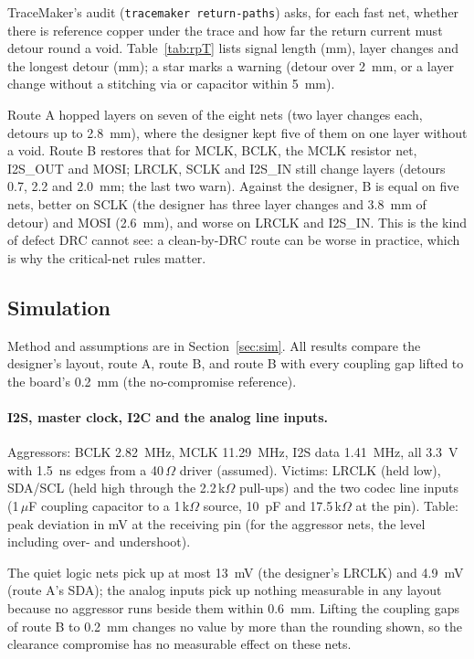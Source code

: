 \documentclass[10pt,a4paper]{article}
\begin{document}
TraceMaker's audit (\texttt{tracemaker return-paths}) asks, for each fast net, whether there is reference copper under the trace and how far the return current must detour round a void. Table~\ref{tab:rpT} lists
signal length (mm), layer changes and the longest detour (mm); a star marks a warning (detour over 2~mm, or a layer change without a stitching via or capacitor within 5~mm).
\begin{table}[H]\centering\small\caption{Return-path audit of the fast nets: signal mm / layer changes / detour mm.}\label{tab:rpT}\end{table}
Route A hopped layers on seven of the eight nets (two layer changes each, detours up to 2.8~mm), where the designer kept five of them on one layer without a void. Route B restores that for MCLK, BCLK, the MCLK resistor net, I2S\_OUT and MOSI;
LRCLK, SCLK and I2S\_IN still change layers (detours 0.7, 2.2 and 2.0~mm; the last two warn). Against the designer, B is equal on five nets, better on SCLK (the designer has three layer changes and 3.8~mm of detour) and MOSI (2.6~mm), and worse on LRCLK and I2S\_IN.
This is the kind of defect DRC cannot see: a clean-by-DRC route can be worse in practice, which is why the critical-net rules matter.

\subsection{Simulation}\label{sec:simT}

Method and assumptions are in Section~\ref{sec:sim}. All results compare the designer's layout, route A, route B, and route B with every coupling gap lifted to the board's 0.2~mm (the no-compromise reference).

\paragraph{I2S, master clock, I2C and the analog line inputs.} Aggressors: BCLK 2.82~MHz, MCLK 11.29~MHz, I2S data 1.41~MHz, all 3.3~V with 1.5~ns edges from a 40\,$\Omega$ driver (assumed). Victims: LRCLK (held low), SDA/SCL (held high through the 2.2\,k$\Omega$ pull-ups) and the two codec line inputs
(1\,$\mu$F coupling capacitor to a 1\,k$\Omega$ source, 10~pF and 17.5\,k$\Omega$ at the pin). Table: peak deviation in mV at the receiving pin (for the aggressor nets, the level including over- and undershoot).
\begin{table}[H]\centering\small\caption{I2S case: peak deviation (mV) at the codec pin. 2 $\mu$s transient, 0.05~ns step.}\end{table}
The quiet logic nets pick up at most 13~mV (the designer's LRCLK) and 4.9~mV (route A's SDA); the analog inputs pick up nothing measurable in any layout because no aggressor runs beside them within 0.6~mm. Lifting the coupling gaps
of route B to 0.2~mm changes no value by more than the rounding shown, so the clearance compromise has no measurable effect on these nets.
\end{document}
